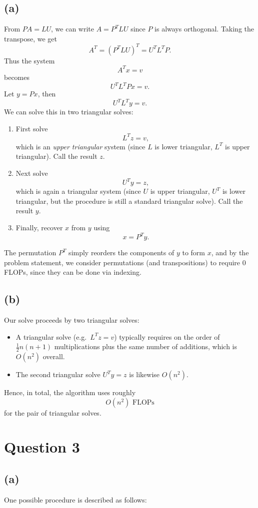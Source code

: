 \documentclass{article}
\begin{document}
\subsection*{(a)}
From $PA = LU$, we can write $A = P^T LU$ since $P$ is always orthogonal. Taking the transpose, we get
$$
    A^T = (P^T LU)^T = U^TL^TP.
$$
Thus the system
$$
    A^T x = v
$$
becomes
$$
    U^T  L^T  P  x = v.
$$
Let $y = Px$, then
$$
    U^T  L^T  y = v.
$$
We can solve this in two triangular solves:
\begin{enumerate}
    \item First solve
          $$
              L^Tz = v,
          $$
          which is an \emph{upper triangular} system (since $L$ is lower triangular, $L^T$ is upper triangular). Call the result $z$.
    \item Next solve
          $$
              U^Ty = z,
          $$
          which is again a triangular system (since $U$ is upper triangular, $U^T$ is lower triangular, but the procedure is still a standard triangular solve). Call the result $y$.
    \item Finally, recover $x$ from $y$ using
          $$
              x = P^T  y.
          $$
\end{enumerate}
The permutation $P^T$ simply reorders the components of $y$ to form $x$, and by the problem statement, we consider permutations (and transpositions) to require 0 FLOPs, since they can be done via indexing.

\subsection*{(b)}
Our solve proceeds by two triangular solves:
\begin{itemize}
    \item A triangular solve (e.g.\ $L^T z = v$) typically requires on the order of $\tfrac12n(n+1)$ multiplications plus the same number of additions, which is $O(n^2)$ overall.
    \item The second triangular solve $U^T y = z$ is likewise $O(n^2)$.
\end{itemize}

Hence, in total, the algorithm uses roughly
$$
    \boxed{O(n^2) \text{ FLOPs}}
$$
for the pair of triangular solves.

\newpage
\section*{Question 3}
\subsection*{(a)}
One possible procedure is described as follows:
\end{document}
